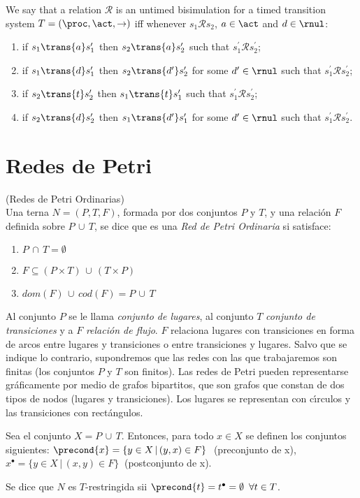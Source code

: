 We say that a relation $\mathcal{R}$ is an untimed bisimulation for a timed transition system 
$T=\left(\proc, \act,\rightarrow\right)$ iff whenever $s_1 \mathcal{R} s_2$, $a \in \act$ and $d \in \rnul$:
\begin{enumerate}
\item if $s_1\trans{a}s^\prime_1$ then $s_2\trans{a}s^\prime_2$ such that $s^\prime_1 \mathcal{R} s^\prime_2$;
\item if $s_1\trans{d}s^\prime_1$ then $s_2\trans{d^\prime}s^\prime_2$ for some $d^\prime \in \rnul$ such that $s^\prime_1 \mathcal{R} s^\prime_2$;
\item if $s_2\trans{t}s^\prime_2$ then $s_1\trans{t}s^\prime_1$ such that $s^\prime_1 \mathcal{R} s^\prime_2$;
\item if $s_2\trans{d}s^\prime_2$ then $s_1\trans{d^\prime}s^\prime_1$ for some $d^\prime \in \rnul$ such that $s^\prime_1 \mathcal{R} s^\prime_2$.
\end{enumerate}

\section{Redes de Petri}

\begin{definition} (Redes de Petri Ordinarias)\\
Una terna $N=(P,T,F)$, formada por dos
conjuntos $P$ y $T$, y una relaci\'{o}n $F$ definida sobre
$P \,\cup\,T$, se dice que es una {\em Red de Petri Ordinaria} si
satisface:
\begin{enumerate}
\item $P \,\cap \,T = \emptyset$
\item $F \subseteq (P \times T) \,\cup\, (T \times P)$
\item $dom(F) \, \cup \, cod(F) = P \, \cup \, T$
\end{enumerate}

Al conjunto $P$ se le llama {\it conjunto de lugares}, al
conjunto $T$ {\it conjunto de transiciones} y a $F$
{\it relaci\'{o}n de flujo}. $F$ relaciona lugares
con transiciones en forma de arcos entre lugares y transiciones
o entre transiciones y lugares.
Salvo que se indique lo contrario, supondremos que las
redes con las que trabajaremos son finitas (los conjuntos
$P$ y $T$ son finitos).
Las redes de Petri pueden
representarse gr\'{a}ficamente por medio de grafos bipartitos, que son
grafos que constan de dos tipos de
nodos (lugares y transiciones). Los lugares se representan con
c\'{\i}rculos y las transiciones con rect\'{a}ngulos.

Sea el conjunto $X = P\,\cup\,T$. Entonces, para todo $x \in X$
se definen los conjuntos siguientes:
$\precond{x} = \{ y \in X \,|\, (y,x) \in F\}~$ (preconjunto de
x), $x^{\bullet} = \{ y \in X \,|\, (x,y) \in F\}~$ (postconjunto
de x).

Se dice que $N$ es $T$-restringida sii $\precond{t} = t^{\bullet} =
\emptyset\,\,\,\forall t \in T$.
\end{definition}

